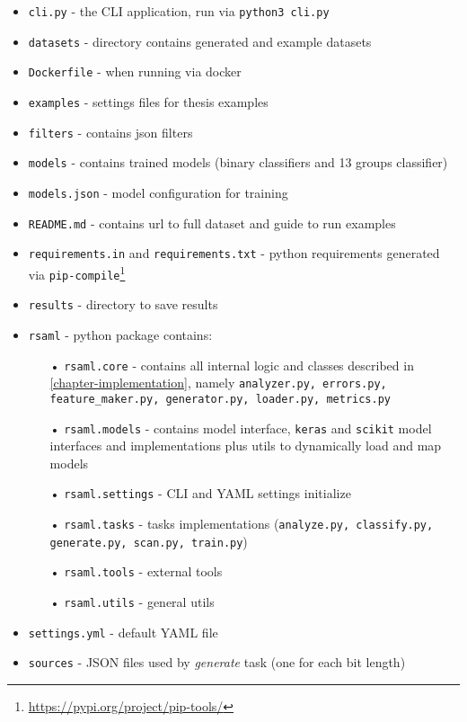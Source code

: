 \begin{itemize}

\item \texttt{cli.py} - the CLI application, run via \texttt{python3 cli.py}
\item \texttt{datasets} - directory contains generated and example datasets
\item \texttt{Dockerfile} - when running via docker
\item \texttt{examples} - settings files for thesis examples
\item \texttt{filters} - contains json filters
\item \texttt{models} - contains trained models (binary classifiers and 13 groups classifier)
\item \texttt{models.json} - model configuration for training
\item \texttt{README.md} - contains url to full dataset and guide to run examples
\item \texttt{requirements.in} and \texttt{requirements.txt} - python requirements generated via \texttt{pip-compile}\footnote{\url{https://pypi.org/project/pip-tools/}}
\item \texttt{results} - directory to save results
\item \texttt{rsaml} - python package contains:
\begin{itemize}
\item[•] \texttt{rsaml.core} - contains all internal logic and classes described in \autoref{chapter-implementation}, namely \texttt{analyzer.py, errors.py, feature\_maker.py, generator.py, loader.py, metrics.py}
\item[•] \texttt{rsaml.models} - contains model interface, \texttt{keras} and \texttt{scikit} model interfaces and implementations plus utils to dynamically load and map models
\item[•] \texttt{rsaml.settings} - CLI and YAML settings initialize
\item[•] \texttt{rsaml.tasks} - tasks implementations (\texttt{analyze.py, classify.py, generate.py, scan.py, train.py})
\item[•] \texttt{rsaml.tools} - external tools
\item[•] \texttt{rsaml.utils} - general utils
\end{itemize}
\item \texttt{settings.yml} - default YAML file
\item \texttt{sources} - JSON files used by \textit{generate} task (one for each bit length)

\end{itemize}


